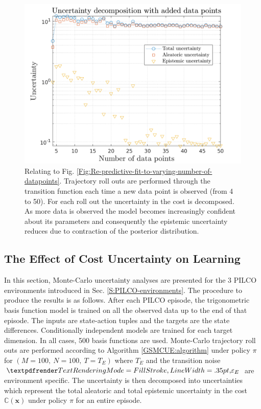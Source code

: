 \begin{figure}[htp!]
\centering    
\includegraphics[width=1\textwidth]{Chapter3/Figures/func_uncertainty_4.png}
\caption[Uncertainty decomposition showing reduction in epistemic uncertainty with increasing number of data points]{Relating to Fig. \ref{Fig:Re-predictive-fit-to-varying-number-of-datapoints}. Trajectory roll outs are performed through the transition function each time a new data point is observed (from 4 to 50). For each roll out the uncertainty in the cost is decomposed. As more data is observed the model becomes increasingly confident about its parameters and consequently the epistemic uncertainty reduces due to contraction of the posterior distribution.}
\label{Fig:Re-reduction-in-epsitemic-with-more-data}
\end{figure}


\subsection{The Effect of Cost Uncertainty on Learning}
In this section, Monte-Carlo uncertainty analyses  are presented for the 3 PILCO environments introduced in Sec. \ref{S:PILCO-environments}. The procedure to produce the results is as follows. After each PILCO episode, the trigonometric basis function model is trained on all the observed data up to the end of that episode. The inputs are state-action tuples and the targets are the state differences. Conditionally independent models are trained for each target dimension. In all cases, 500 basis functions are used. Monte-Carlo trajectory roll outs are performed according to Algorithm \ref{GSMCUE:algorithm} under policy $\pi$ for $(M=100,\:N=100,\:T=T_{E})$ where $T_{E}$ and the transition noise $\boldgreek{\varepsilon}_{E}$ are environment specific. The uncertainty is then decomposed into uncertainties which represent the total aleatoric and total epistemic uncertainty in the cost $\mathbb{C}(\mathbf{x})$ under policy $\pi$ for an entire episode.   

